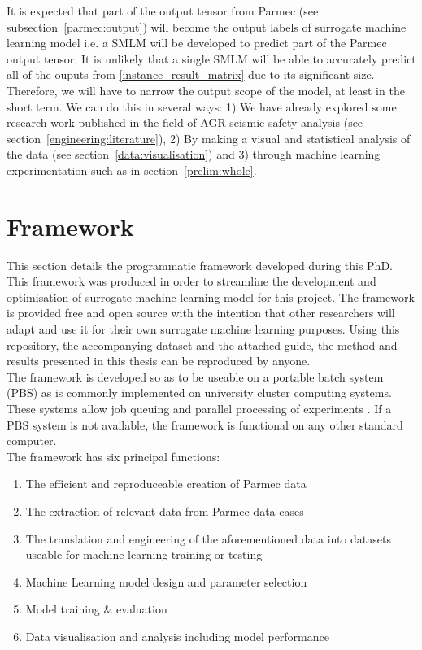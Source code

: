 It is expected that part of the output tensor from Parmec (see subsection~\ref{parmec:output}) will become the output labels of surrogate machine learning model i.e. a SMLM will be developed to predict part of the Parmec output tensor. It is unlikely that a single SMLM will be able to accurately predict all of the ouputs from \ref{instance_result_matrix} due to its significant size. Therefore, we will have to narrow the output scope of the model, at least in the short term. We can do this in several ways: 1) We have already explored some research work published in the field of AGR seismic safety analysis (see section~\ref{engineering:literature}), 2) By making a visual and statistical analysis of the data (see section~\ref{data:visualisation})  and 3) through machine learning experimentation such as in section~\ref{prelim:whole}.


\section{Framework} \label{framework}

This section details the programmatic framework \cite{Jones2018} developed during this PhD. This framework was produced in order to streamline the development and optimisation of surrogate machine learning model for this project. The framework is provided free and open source with the intention that other researchers will adapt and use it for their own surrogate machine learning purposes. Using this repository, the accompanying dataset \cite{huw_rhys_jones_2022_6967536} and the attached guide, the method and results presented in this thesis can be reproduced by anyone.
\\

\noindent
The framework is developed so as to be useable on a portable batch system (PBS) as is commonly implemented on university cluster computing systems. These systems allow job queuing and parallel processing of experiments \cite{henderson1995job}. If a PBS system is not available, the framework is functional on any other standard computer.
\\

\noindent
The framework has six principal functions:

\begin{enumerate}
	\item The efficient and reproduceable creation of Parmec data 
	\item The extraction of relevant data from Parmec data cases
	\item The translation and engineering of the aforementioned data into datasets useable for machine learning training or testing 
	\item Machine Learning model design and parameter selection
	\item Model training \& evaluation
	\item Data visualisation and analysis including model performance 
\end{enumerate}

